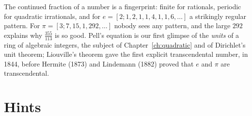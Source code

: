 \begin{beauty}
The continued fraction of a number is a fingerprint: finite for rationals, periodic for quadratic irrationals, and for $e=[2;1,2,1,1,4,1,1,6,\dots]$ a strikingly regular pattern. For $\pi=[3;7,15,1,292,\dots]$ nobody sees any pattern, and the large $292$ explains why $\frac{355}{113}$ is so good. Pell's equation is our first glimpse of the \emph{units} of a ring of algebraic integers, the subject of Chapter~\ref{ch:quadratic} and of Dirichlet's unit theorem; Liouville's theorem gave the first explicit transcendental number, in 1844, before Hermite (1873) and Lindemann (1882) proved that $e$ and $\pi$ are transcendental.
\end{beauty}

\section{Hints}

